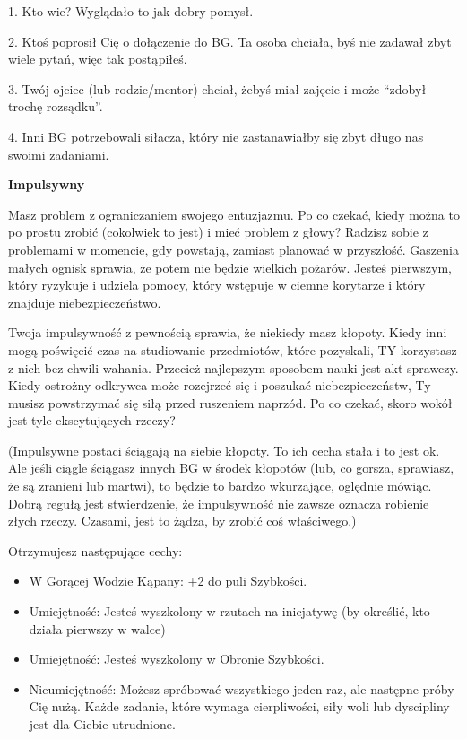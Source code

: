 1. Kto wie? Wyglądało to jak dobry pomysł.

2. Ktoś poprosił Cię o dołączenie do BG. Ta osoba chciała, byś nie zadawał zbyt wiele pytań, więc tak postąpiłeś.

3. Twój ojciec (lub rodzic/mentor) chciał, żebyś miał zajęcie i może “zdobył trochę rozsądku”.

4. Inni BG potrzebowali siłacza, który nie zastanawiałby się zbyt długo nas swoimi zadaniami.

\textbf{Impulsywny}

Masz problem z ograniczaniem swojego entuzjazmu. Po co czekać, kiedy można to po prostu zrobić (cokolwiek to jest) i mieć problem z głowy? Radzisz sobie z problemami w momencie, gdy powstają, zamiast planować w przyszłość. Gaszenia małych ognisk sprawia, że potem nie będzie wielkich pożarów. Jesteś pierwszym, który ryzykuje i udziela pomocy, który wstępuje w ciemne korytarze i który znajduje niebezpieczeństwo.

Twoja impulsywność z pewnością sprawia, że niekiedy masz kłopoty. Kiedy inni mogą poświęcić czas na studiowanie przedmiotów, które pozyskali, TY korzystasz z nich bez chwili wahania. Przecież najlepszym sposobem nauki jest akt sprawczy. Kiedy ostrożny odkrywca może rozejrzeć się i poszukać niebezpieczeństw, Ty musisz powstrzymać się siłą przed ruszeniem naprzód. Po co czekać, skoro wokół jest tyle ekscytujących rzeczy?

(Impulsywne postaci ściągają na siebie kłopoty. To ich cecha stała i to jest ok. Ale jeśli ciągle ściągasz innych BG w środek kłopotów (lub, co gorsza, sprawiasz, że są zranieni lub martwi), to będzie to bardzo wkurzające, oględnie mówiąc. Dobrą regułą jest stwierdzenie, że impulsywność nie zawsze oznacza robienie złych rzeczy. Czasami, jest to żądza, by zrobić coś właściwego.)

Otrzymujesz następujące cechy:
\begin{itemize}
\item W Gorącej Wodzie Kąpany: +2 do puli Szybkości.
\item  Umiejętność: Jesteś wyszkolony w rzutach na inicjatywę (by określić, kto działa pierwszy w walce)
\item Umiejętność: Jesteś wyszkolony w Obronie Szybkości.
\item Nieumiejętność: Możesz spróbować wszystkiego jeden raz, ale następne próby Cię nużą. Każde zadanie, które wymaga cierpliwości, siły woli lub dyscipliny jest dla Ciebie utrudnione. 
\end{itemize}

